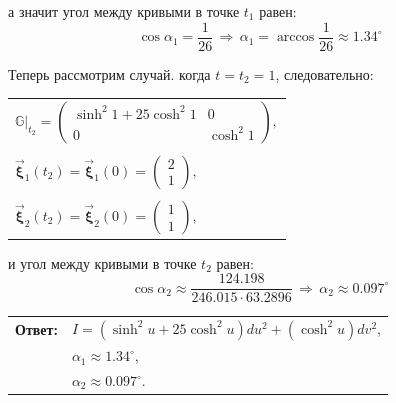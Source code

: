 \documentclass[12pt,a4paper]{article}
\newcommand{\boldVec}[1]{\vec{\mathbf #1}}
\begin{document}
    \noindent а значит угол между кривыми в точке $ t_1 $ равен:
    \[
        \cos \alpha_1 = \frac{1}{26}
        \,\Rightarrow\,
        \alpha_1 = \arccos{\frac{1}{26}} \approx 1.34^{\circ}
    \]

    Теперь рассмотрим случай. когда $ t = t_2 = 1 $, следовательно:
    \begin{table}[h]
        \centering
        \begin{tabular}{l}
            $ \mathbb{G}|_{t_2} = 
                \begin{pmatrix}
                    \sinh^2 1 + 25 \cosh^2 1 & 0
                    \\
                    0                        & \cosh^2 1
                \end{pmatrix}\! ,
            $
            \\ \\
            $ \boldVec \xi_1(t_2) = \boldVec \xi_1(0) = 
                \begin{pmatrix}
                    2
                    \\
                    1
                \end{pmatrix}\! ,
            $ 
            \\ \\
            $ \boldVec \xi_2(t_2) = \boldVec \xi_2(0) = 
                \begin{pmatrix}
                    1
                    \\
                    1
                \end{pmatrix}\! ,
            $ 
        \end{tabular}
    \end{table}

    \noindent и угол между кривыми в точке $ t_2 $ равен:
    \[
        \cos \alpha_2 \approx \frac{124.198}{246.015 \cdot 63.2896}
        \,\Rightarrow\,
        \alpha_2 \approx 0.097^{\circ}
    \]

    \begin{flushright}
        \begin{tabular}{rl}
            \textbf{Ответ:} & $ I = (\sinh^2 u + 25 \cosh^2 u)du^2 + (\cosh^2 u) dv^2 $,

            \\

                            & $ \alpha_1 \approx 1.34^{\circ} $,

            \\

                            & $ \alpha_2 \approx 0.097^{\circ} $.
        \end{tabular}
    \end{flushright}
\end{document}
